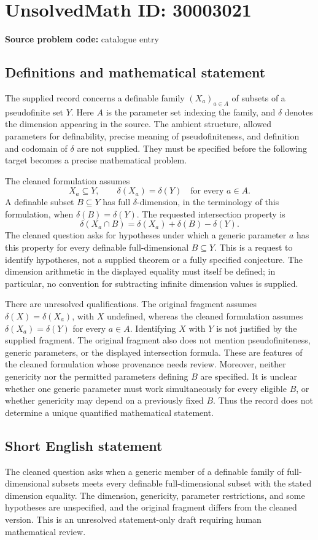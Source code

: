 \documentclass[11pt]{article}
\begin{document}
\section*{UnsolvedMath ID: 30003021}
\textbf{Source problem code:} catalogue entry
\subsection{Definitions and mathematical statement}
The supplied record concerns a definable family \((X_a)_{a\in A}\) of subsets of a pseudofinite set \(Y\). Here \(A\) is the parameter set indexing the family, and \(\delta\) denotes the dimension appearing in the source. The ambient structure, allowed parameters for definability, precise meaning of pseudofiniteness, and definition and codomain of \(\delta\) are not supplied. They must be specified before the following target becomes a precise mathematical problem.

The cleaned formulation assumes
\[
X_a\subseteq Y,\qquad \delta(X_a)=\delta(Y)\quad\text{for every }a\in A.
\]
A definable subset \(B\subseteq Y\) has full \(\delta\)-dimension, in the terminology of this formulation, when \(\delta(B)=\delta(Y)\). The requested intersection property is
\[
\delta(X_a\cap B)=\delta(X_a)+\delta(B)-\delta(Y).
\]
The cleaned question asks for hypotheses under which a generic parameter \(a\) has this property for every definable full-dimensional \(B\subseteq Y\). This is a request to identify hypotheses, not a supplied theorem or a fully specified conjecture. The dimension arithmetic in the displayed equality must itself be defined; in particular, no convention for subtracting infinite dimension values is supplied.

There are unresolved qualifications. The original fragment assumes \(\delta(X)=\delta(X_a)\), with \(X\) undefined, whereas the cleaned formulation assumes \(\delta(X_a)=\delta(Y)\) for every \(a\in A\). Identifying \(X\) with \(Y\) is not justified by the supplied fragment. The original fragment also does not mention pseudofiniteness, generic parameters, or the displayed intersection formula. These are features of the cleaned formulation whose provenance needs review. Moreover, neither genericity nor the permitted parameters defining \(B\) are specified. It is unclear whether one generic parameter must work simultaneously for every eligible \(B\), or whether genericity may depend on a previously fixed \(B\). Thus the record does not determine a unique quantified mathematical statement.
\subsection{Short English statement}
The cleaned question asks when a generic member of a definable family of full-dimensional subsets meets every definable full-dimensional subset with the stated dimension equality. The dimension, genericity, parameter restrictions, and some hypotheses are unspecified, and the original fragment differs from the cleaned version. This is an unresolved statement-only draft requiring human mathematical review.
\end{document}
